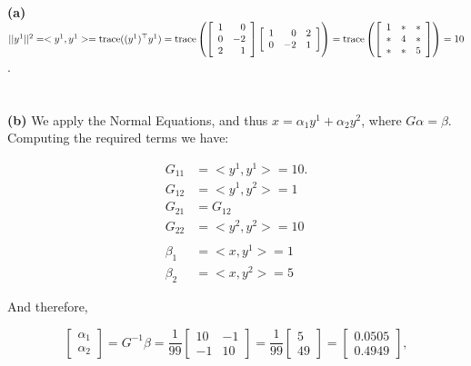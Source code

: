 \documentclass[letterpaper]{article}
\begin{document}
\textbf{(a)} $||y^1||^2 = <y^1,y^1> =\mathrm{trace}((y^1)^\top y^1)  =\mathrm{trace}\left( \left[ \begin{array}{rr} 1 & 0 \\ 0 & -2 \\ 2 & 1 \end{array} \right]  \left[ \begin{array}{rrr} 1 & 0 & 2 \\ 0 & -2 & 1\end{array} \right] \right) = \mathrm{trace}\left( \left[ \begin{array}{rrr} 1 & * & * \\ * & 4 & * \\ * & * & 5\end{array} \right] \right)=10$.\\

\\ \\

\textbf{(b)} We apply the Normal Equations, and thus $\hat{x}=\alpha_1 y^1 + \alpha_2 y^2$, where $G \alpha = \beta$. Computing the required terms we have:

\begin{align*}
G_{11}&= <y^1,y^1> = 10. \\
G_{12}&= <y^1,y^2> = 1\\
G_{21}&=G_{12} \\
G_{22}&=<y^2,y^2>= 10 \\
\\
\beta_1 &=<x,y^1> = 1\\
\beta_2 &= <x,y^2>= 5
\end{align*}

And therefore,

$$\left[\begin{array}{cc} \alpha_1 \\ \alpha_2  \end{array}  \right] = G^{-1} \beta = \frac{1}{99} \left[  \begin{array}{rr} 10 & -1 \\ -1 & 10 \end{array}  \right] = \frac{1}{99} \left[ \begin{array}{c} 5 \\ 49 \end{array} \right]= \left[ \begin{array}{c} 0.0505 \\ 0.4949 \end{array} \right],$$
\end{document}
